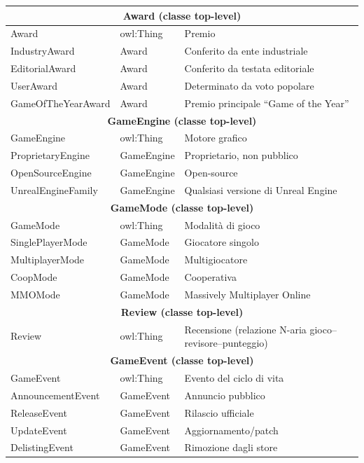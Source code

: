 \begin{longtable}{llp{5cm}}
\multicolumn{3}{c}{\textbf{Award (classe top-level)}} \\
\midrule
Award               & owl:Thing       & Premio \\
IndustryAward       & Award           & Conferito da ente industriale \\
EditorialAward      & Award           & Conferito da testata editoriale \\
UserAward           & Award           & Determinato da voto popolare \\
GameOfTheYearAward  & Award           & Premio principale ``Game of the Year'' \\
\midrule

\multicolumn{3}{c}{\textbf{GameEngine (classe top-level)}} \\
\midrule
GameEngine          & owl:Thing       & Motore grafico \\
ProprietaryEngine   & GameEngine      & Proprietario, non pubblico \\
OpenSourceEngine    & GameEngine      & Open-source \\
UnrealEngineFamily  & GameEngine      & Qualsiasi versione di Unreal Engine \\
\midrule

\multicolumn{3}{c}{\textbf{GameMode (classe top-level)}} \\
\midrule
GameMode            & owl:Thing       & Modalit\`a di gioco \\
SinglePlayerMode    & GameMode        & Giocatore singolo \\
MultiplayerMode     & GameMode        & Multigiocatore \\
CoopMode            & GameMode        & Cooperativa \\
MMOMode             & GameMode        & Massively Multiplayer Online \\
\midrule

\multicolumn{3}{c}{\textbf{Review (classe top-level)}} \\
\midrule
Review              & owl:Thing       & Recensione (relazione N-aria gioco--revisore--punteggio) \\
\midrule

\multicolumn{3}{c}{\textbf{GameEvent (classe top-level)}} \\
\midrule
GameEvent           & owl:Thing       & Evento del ciclo di vita \\
AnnouncementEvent   & GameEvent       & Annuncio pubblico \\
ReleaseEvent        & GameEvent       & Rilascio ufficiale \\
UpdateEvent         & GameEvent       & Aggiornamento/patch \\
DelistingEvent      & GameEvent       & Rimozione dagli store \\
\bottomrule
\end{longtable}

